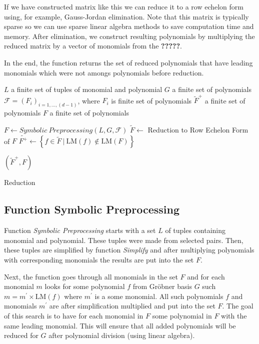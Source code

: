 If we have constructed matrix like this we can reduce it to a row echelon form using, for example, Gauss-Jordan elimination. Note that this matrix is typically sparse so we can use sparse linear algebra methods to save computation time and memory. After elimination, we construct resulting polynomials by multiplying the reduced matrix by a vector of monomials from the \textbf{?????}.

In the end, the function returns the set of reduced polynomials that have leading monomials which were not amongs polynomials before reduction.

\begin{algorithm}[ht]
  \begin{algorithmic}[1]
    \Require
      \Statex $L$ a finite set of tuples of monomial and polynomial
      \Statex $G$ a finite set of polynomials
      \Statex $\mathcal{F} = (F_i)_{i=1,\ldots,(d-1)}$, where $F_i$ is finite set of polynomials
    \Ensure
      \Statex $\tilde{F}^+$ a finite set of polynomials
      \Statex $F$ a finite set of polynomials
      \Statex

    \State $F \gets Symbolic\ Preprocessing(L, G, \mathcal{F})$
    \State $\tilde{F} \gets$ Reduction to Row Echelon Form of $F$
    \State $\tilde{F^+} \gets \left\{f \in \tilde{F}\ |\ \textrm{LM}(f) \notin \textrm{LM}(F)\right\}$

    \State \Return $(\tilde{F}^+, F)$

  \end{algorithmic}
  \caption{Reduction}
\end{algorithm}

\subsection{Function Symbolic Preprocessing}
Function \textit{Symbolic Preprocessing} starts with a set $L$ of tuples containing monomial and polynomial. These tuples were made from selected pairs. Then, these tuples are simplified by function \textit{Simplify} and after multiplying polynomials with corresponding monomials the results are put into the set $F$.

Next, the function goes through all monomials in the set $F$ and for each monomial $m$ looks for some polynomial $f$ from Gr\"obner basis $G$ such $m = m^\prime \times \textrm{LM}(f)$ where $m^\prime$ is a some monomial. All such polynomials $f$ and monomials $m^\prime$ are after simplification multiplied and put into the set $F$. The goal of this search is to have for each monomial in $F$ some polynomial in $F$ with the same leading monomial. This will ensure that all added polynomials will be reduced for $G$ after polynomial division (using linear algebra).

